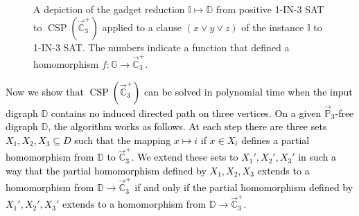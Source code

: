 \documentclass{article}
\theoremstyle{definition}
\theoremstyle{remark}
\newcommand{\blue}[1]{\textcolor{black}{#1}}
\DeclareMathOperator{\CSP}{CSP}
\newcommand{\bC}{{\mathbb C}}
\newcommand{\bD}{{\mathbb D}}
\newcommand{\bG}{{\mathbb G}}
\newcommand{\bI}{{\mathbb I}}
\newcommand{\bP}{{\mathbb P}}
\begin{document}
\begin{figure}[ht!]
\centering
{}
\caption{
A depiction of the gadget reduction $\bI\mapsto \bD$ from positive 1-IN-3 SAT to
$\CSP(\vec{\bC}_3^+)$  applied to a clause $(x\lor y \lor z)$ of the instance $\bI$ to
1-IN-3 SAT. The numbers indicate a function that defined a homomorphism 
$f\colon \bG\to \vec{\bC}_3^+$.}
\label{fig:C3+-gadget}
\end{figure}


\blue{Now we show that $\CSP(\vec{\bC}_3^+)$ can be solved in polynomial time when the
input digraph $\bD$ contains no induced directed path on three vertices. On a given
$\vec{\bP}_3$-free digraph $\bD$, the algorithm works as follows. At each
step there are three sets $X_1,X_2,X_3\subseteq D$ such that the mapping $x\mapsto i$ if
$x\in X_i$ defines a partial homomorphism from $\bD$ to $\vec{\bC}_3^+$. We extend
these sets to $X_1',X_2',X_3'$ in such a way that the partial homomorphism
defined by $X_1,X_2,X_3$ extends to a homomorphism from $\bD\to \vec{\bC}_3^+$ if
and only if the partial homomorphism defined by $X_1',X_2',X_3'$ extends to 
a homomorphism from $\bD\to \vec{\bC}_3^+$.}
\end{document}

